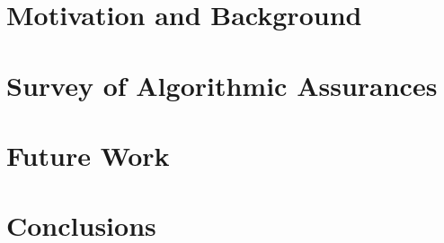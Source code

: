 \documentclass[format=manuscript, screen,review=true]{acmart}
\begin{document}
\section{Motivation and Background} \label{sec:background}


\section{Survey of Algorithmic Assurances} \label{sec:synthesis}


\section{Future Work} \label{sec:future_work}


\section{Conclusions}\label{sec:conclusions}




\end{document}
